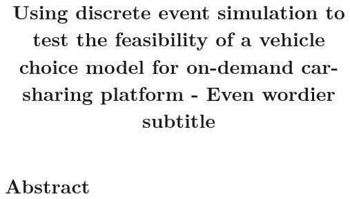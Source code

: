 \documentclass[a4paper, oneside, 12pt]{article}
\title{Using discrete event simulation to test the feasibility of a vehicle choice model for on-demand car-sharing platform - Even wordier subtitle}
\begin{document}




\clearpage
\thispagestyle{empty}
\section*{Abstract}



\clearpage
{}
\tableofcontents
\clearpage
\listoffigures
\clearpage
\listoftables
\clearpage


















\appendix
\renewcommand*{\thesection}{\Alph{section}}\textbf{}




\clearpage
\renewcommand*{\thesection}{}\textbf{}



\end{document}
